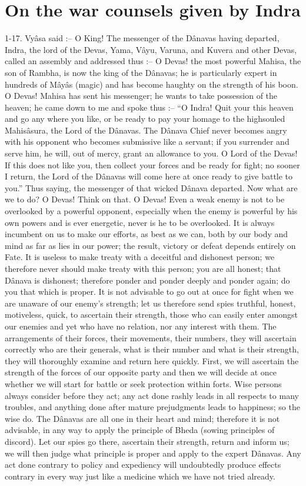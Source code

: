 ﻿\chapter{On the war counsels given by Indra}

1-17. Vy\^asa said :-- O King! The messenger of the D\^anavas having departed, Indra, the lord of the Devas, Yama, V\^ayu, Varuna, and Kuvera and other Devas, called an assembly and addressed thus :-- O Devas! the most powerful Mahisa, the son of Rambha, is now the king of the D\^anavas; he is particularly expert in hundreds of M\^ay\^as (magic) and has become haughty on the strength of his boon. O Devas! Mahisa has sent his messenger; he wants to take possession of the heaven; he came down to me and spoke thus :-- ``O Indra! Quit your this heaven and go any where you like, or be ready to pay your homage to the highsouled Mahis\^asura, the Lord of the D\^anavas. The D\^anava Chief never becomes angry with his opponent who becomes submissive like a servant; if you surrender and serve him, he will, out of mercy, grant an allowance to you. O Lord of the Devas! If this does not like you, then collect your forces and be ready for fight; no sooner I return, the Lord of the D\^anavas will come here at once ready to give battle to you.'' Thus saying, the messenger of that wicked D\^anava departed. Now what are we to do? O Devas! Think on that. O Devas! Even a weak enemy is not to be overlooked by a powerful opponent, especially when the enemy is powerful by his own powers and is ever energetic, never is he to be overlooked. It is always incumbent on us to make our efforts, as best as we can, both by our body and mind as far as lies in our power; the result, victory or defeat depends entirely on Fate. It is useless to make treaty with a deceitful and dishonest person; we therefore never should make treaty with this person; you are all honest; that D\^anava is dishonest; therefore ponder and ponder deeply and ponder again; do you that which is proper. It is not advisable to go out at once for fight when we are unaware of our enemy's strength; let us therefore send spies truthful, honest, motiveless, quick, to ascertain their strength, those who can easily enter amongst our enemies and yet who have no relation, nor any interest with them. The arrangements of their forces, their movements, their numbers, they will ascertain correctly who are their generals, what is their number and what is their strength, they will thoroughly examine and return here quickly. First, we will ascertain the strength of the forces of our opposite party and then we will decide at once whether we will start for battle or seek protection within forts. Wise persons always consider before they act; any act done rashly leads in all respects to many troubles, and anything done after mature prejudgments leads to happiness; so the wise do. The D\^anavas are all one in their heart and mind; therefore it is not advisable, in any way to apply the principle of Bheda (sowing principles of discord). Let our spies go there, ascertain their strength, return and inform us; we will then judge what principle is proper and apply to the expert D\^anavas. Any act done contrary to policy and expediency will undoubtedly produce effects contrary in every way just like a medicine which we have not tried already.

